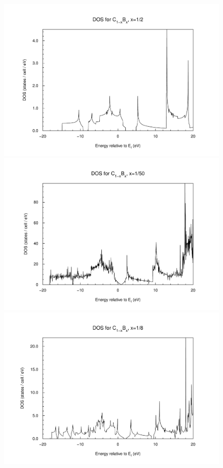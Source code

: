 				\begin{figure}
					\begin{minipage}[t]{0.9\textwidth}
						\includegraphics[width=\textwidth]{Results/Bor/Bor1/bor1dos.pdf}
					\end{minipage}
					\begin{minipage}[t]{0.9\textwidth}
						\includegraphics[width=\textwidth]{Results/Bor/Bor5/bor5dos.pdf}
					\end{minipage}
					\begin{minipage}[t]{0.3\textwidth}
						\includegraphics[width=\textwidth]{Results/Bor/Bor2/bor2dos.pdf}

\end{minipage}
\end{figure}
